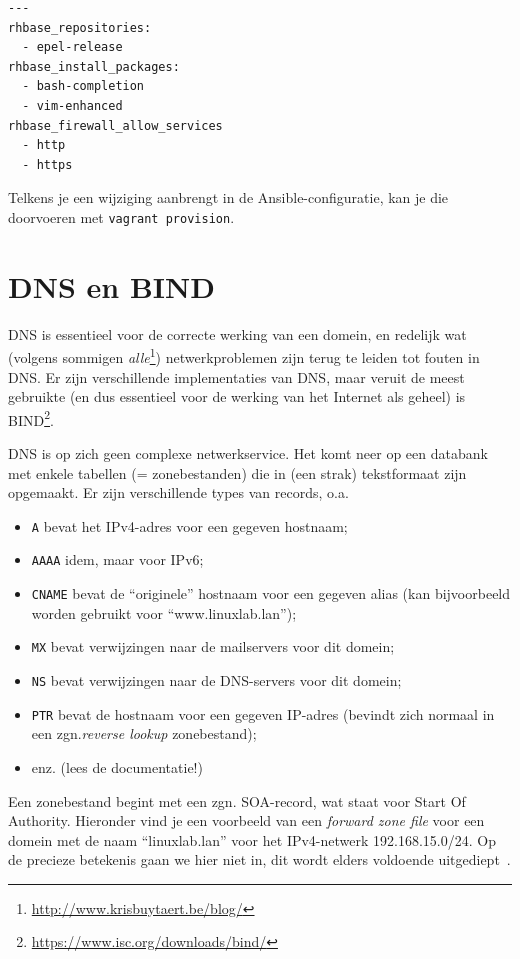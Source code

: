 \begin{verbatim}
---
rhbase_repositories:
  - epel-release
rhbase_install_packages:
  - bash-completion
  - vim-enhanced
rhbase_firewall_allow_services
  - http
  - https
\end{verbatim}

Telkens je een wijziging aanbrengt in de Ansible-configuratie, kan je die doorvoeren met \texttt{vagrant\ provision}.




\section{DNS en BIND}
\label{sec:dns-en-bind}


DNS is essentieel voor de correcte werking van een domein, en redelijk wat (volgens sommigen \emph{alle}\footnote{\url{http://www.krisbuytaert.be/blog/}}) netwerkproblemen zijn terug te leiden tot fouten in DNS. Er zijn verschillende implementaties van DNS, maar veruit de meest gebruikte (en dus essentieel voor de werking van het Internet als geheel) is BIND\footnote{\url{https://www.isc.org/downloads/bind/}}.

DNS is op zich geen complexe netwerkservice. Het komt neer op een databank met enkele tabellen (= zonebestanden) die in (een strak) tekstformaat zijn opgemaakt. Er zijn verschillende types van records, o.a.

\begin{itemize}
\item \texttt{A} bevat het IPv4-adres voor een gegeven hostnaam;
\item \texttt{AAAA} idem, maar voor IPv6;
\item \texttt{CNAME} bevat de ``originele'' hostnaam voor een gegeven alias (kan bijvoorbeeld worden gebruikt voor ``www.linuxlab.lan'');
\item \texttt{MX} bevat verwijzingen naar de mailservers voor dit domein;
\item \texttt{NS} bevat verwijzingen naar de DNS-servers voor dit domein;
\item \texttt{PTR} bevat de hostnaam voor een gegeven IP-adres (bevindt zich normaal in een zgn.\emph{reverse lookup} zonebestand);
\item enz. (lees de documentatie!)
\end{itemize}

Een zonebestand begint met een zgn. SOA-record, wat staat voor Start Of Authority. Hieronder vind je een voorbeeld van een \emph{forward zone file} voor een domein met de naam ``linuxlab.lan'' voor het IPv4-netwerk 192.168.15.0/24. Op de precieze betekenis gaan we hier niet in, dit wordt elders voldoende uitgediept~\autocite{Aitchison2015}.

